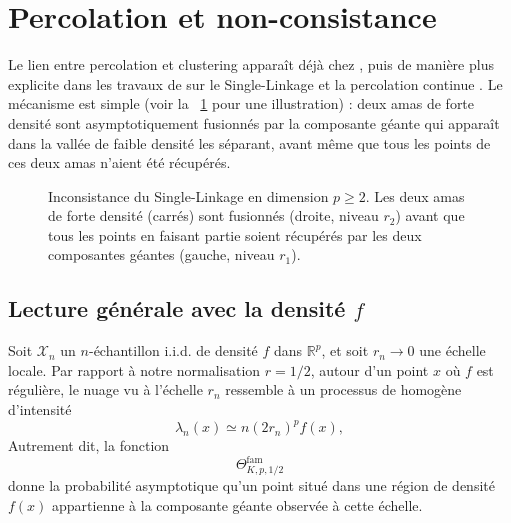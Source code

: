 \section{Percolation et non-consistance}

Le lien entre percolation et clustering apparaît déjà chez  \cite{hartigan81}, puis de manière plus explicite dans les travaux de  sur le Single-Linkage et la percolation continue \cite{Penrose1995, penrose2003}. Le mécanisme est simple (voir la \Fig~\ref{fig:percolation_2_carres} pour une illustration) : deux amas de forte densité sont asymptotiquement fusionnés par la composante géante qui apparaît dans la vallée de faible densité les séparant, avant même que tous les points de ces deux amas n'aient été récupérés.

\begin{figure}[!ht]
  \centering
  \caption{Inconsistance du Single-Linkage en dimension $p\ge2$. Les deux amas de forte densité (carrés) sont fusionnés (droite, niveau $r_2$) avant que tous les points en faisant partie soient récupérés par les deux composantes géantes (gauche, niveau $r_1$).\label{fig:percolation_2_carres}}
\end{figure}

\subsection{Lecture générale avec la densité $f$}

Soit $\mathcal X_n$ un $n$-échantillon i.i.d. de densité $f$ dans $\mathbb R^p$, et soit $r_n\to0$ une échelle locale. Par rapport à notre normalisation $r=1/2$, autour d'un point $x$ où $f$ est régulière, le nuage vu à l'échelle $r_n$ ressemble à un processus de  homogène d'intensité
\[
    \lambda_n(x) \simeq n(2r_n)^p f(x),
\]
Autrement dit, la fonction
\[
    \Theta^{\mathrm{fam}}_{K,p,1/2}
\]
donne la probabilité asymptotique qu'un point situé dans une région de densité $f(x)$ appartienne à la composante géante observée à cette échelle.

